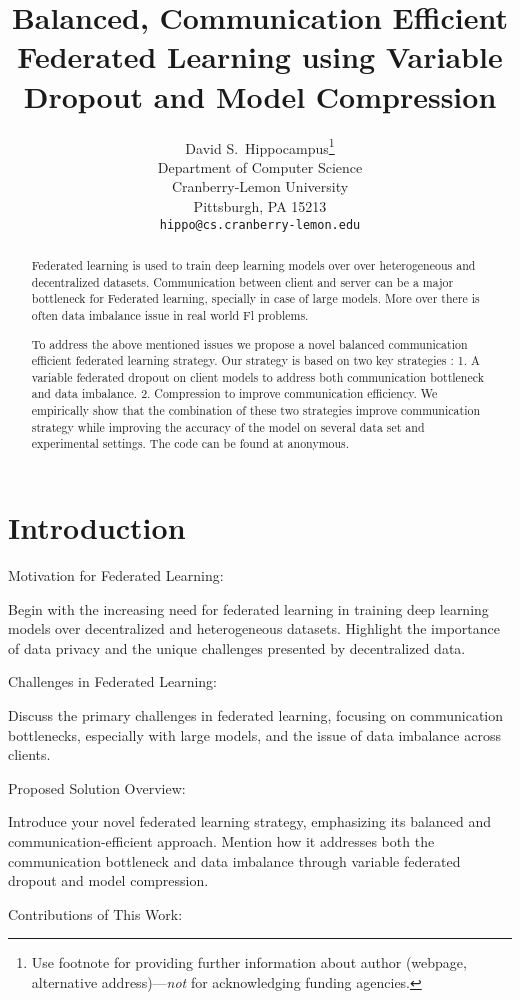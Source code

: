 \documentclass{article}
\title{Balanced, Communication Efficient Federated Learning using Variable Dropout and Model Compression}
\author{%
  David S.~Hippocampus\thanks{Use footnote for providing further information
    about author (webpage, alternative address)---\emph{not} for acknowledging
    funding agencies.} \\
  Department of Computer Science\\
  Cranberry-Lemon University\\
  Pittsburgh, PA 15213 \\
  \texttt{hippo@cs.cranberry-lemon.edu} \\
}
\begin{document}
\maketitle


\begin{abstract}

Federated learning is used to train deep learning models over over heterogeneous and decentralized datasets. Communication between client and server can be a major bottleneck for Federated learning, specially in case of large models. More over there is often data imbalance issue in real world Fl problems. 

To address the above mentioned issues we propose a novel balanced communication efficient federated learning strategy. Our strategy is based on two key strategies : 1. A variable federated dropout on client models to address both communication bottleneck and data imbalance. 2. Compression to improve communication efficiency. We empirically show that the combination of these two strategies improve communication strategy while improving the accuracy of the model on several data set and experimental settings. The code can be found at anonymous.

\end{abstract}


\section{Introduction}

Motivation for Federated Learning: 

Begin with the increasing need for federated learning in training deep learning models over decentralized and heterogeneous datasets. Highlight the importance of data privacy and the unique challenges presented by decentralized data.

Challenges in Federated Learning: 

Discuss the primary challenges in federated learning, focusing on communication bottlenecks, especially with large models, and the issue of data imbalance across clients.

Proposed Solution Overview: 

Introduce your novel federated learning strategy, emphasizing its balanced and communication-efficient approach. Mention how it addresses both the communication bottleneck and data imbalance through variable federated dropout and model compression.

Contributions of This Work: 
\end{document}
